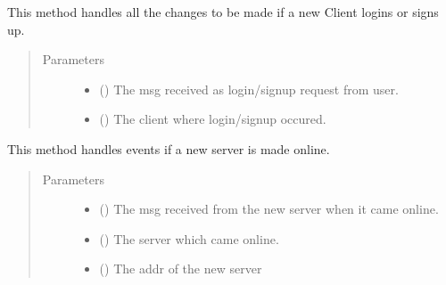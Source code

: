 \documentclass[letterpaper,10pt,english]{sphinxmanual}
\begin{document}
\begin{fulllineitems}
\label{\detokenize{balancerHelper:balancerHelper.newClientConn}}
This method handles all the changes to be made if a new Client logins or signs up.
\begin{quote}\begin{description}
\item[{Parameters}] \leavevmode\begin{itemize}
\item {} 
 () \textendash{} The msg received as login/signup request from user.

\item {} 
 () \textendash{} The client where login/signup occured.

\end{itemize}

\end{description}\end{quote}

\end{fulllineitems}


\begin{fulllineitems}
\label{\detokenize{balancerHelper:balancerHelper.newServerConn}}
This method handles events if a new server is made online.
\begin{quote}\begin{description}
\item[{Parameters}] \leavevmode\begin{itemize}
\item {} 
 () \textendash{} The msg received from the new server when it came online.

\item {} 
 () \textendash{} The server which came online.

\item {} 
 () \textendash{} The addr of the new server

\end{itemize}

\end{description}\end{quote}

\end{fulllineitems}
\end{document}

